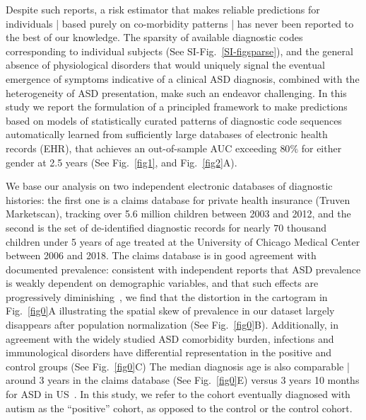 \documentclass[onecolumn,,10pt]{IEEEtran}
\def\treatment{positive\xspace}
\begin{document}
Despite such reports,   a risk estimator that makes reliable predictions for  individuals | based purely on co-morbidity patterns |  has never been reported to the best of our knowledge. The sparsity of available diagnostic codes corresponding to 
individual subjects (See SI-Fig.~\ref{SI-figsparse}), and the general absence of physiological disorders  that would uniquely signal the eventual emergence of symptoms indicative of a clinical ASD diagnosis, combined with the heterogeneity of ASD presentation,  make such an endeavor challenging. In this study we report the  formulation of a principled  framework to make predictions 
based on models of statistically curated patterns of diagnostic code sequences automatically learned from  sufficiently large databases of electronic health records (EHR), that  achieves an out-of-sample AUC exceeding  $80\%$ for  either gender at  2.5 years (See Fig.~\ref{fig1}, and Fig.~\ref{fig2}A). 


We base our analysis on two independent  electronic databases of  diagnostic histories: the first one is a  claims database for private health insurance (Truven Marketscan), tracking over 5.6 million children between  2003 and 2012, and the second is the set of  de-identified diagnostic records  for nearly $70$ thousand children under 5 years of age treated at the  University of Chicago Medical Center between 2006 and 2018. The claims database is in good agreement with  documented prevalence: consistent with independent reports that ASD prevalence is  weakly dependent on demographic variables, and that  such effects are progressively diminishing~\cite{CDCdemo}, we find that  the distortion in the cartogram in  Fig.~\ref{fig0}A illustrating
 the spatial skew of  prevalence in our dataset largely disappears after population normalization (See Fig.~\ref{fig0}B). Additionally, in agreement with the widely studied  ASD comorbidity burden,  infections and immunological disorders have differential representation in the \treatment and control groups (See Fig.~\ref{fig0}C)
The  median diagnosis age is also comparable |  around 3 years in the claims database (See  Fig.~\ref{fig0}E)  versus 3 years 10 months for ASD in US~\cite{pmid29701730}. In this study, we refer to the cohort eventually diagnosed with autism as the ``positive'' cohort, as opposed to the control or the control cohort.

\end{document}

